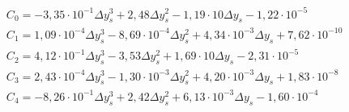 \begin{eqnarray}
&C_0 =-3,35\cdot 10^{-1}\Delta y_s^{3}+2,48\Delta y_s^{2}-1,19\cdot 10\Delta y_s-1,22\cdot 10^{-5} \\                  
&C_1 =1,09\cdot 10^{-4}\Delta y_s^{3}-8,69\cdot 10^{-4}\Delta y_s^{2}+4,34\cdot 10^{-3}\Delta y_s+7,62\cdot 10^{-10} \\
&C_2 =4,12\cdot 10^{-1}\Delta y_s^{3}-3,53\Delta y_s^{2}+1,69\cdot 10\Delta y_s-2,31\cdot 10^{-5} \\                   
&C_3 =2,43\cdot 10^{-4}\Delta y_s^{3}-1,30\cdot 10^{-3}\Delta y_s^{2}+4,20\cdot 10^{-3}\Delta y_s+1,83\cdot 10^{-8} \\ 
&C_4 =-8,26\cdot 10^{-1}\Delta y_s^{3}+2,42\Delta y_s^{2}+6,13\cdot 10^{-3}\Delta y_s-1,60\cdot 10^{-4}            
\end{eqnarray}
%
%
%
%
%
%
%

